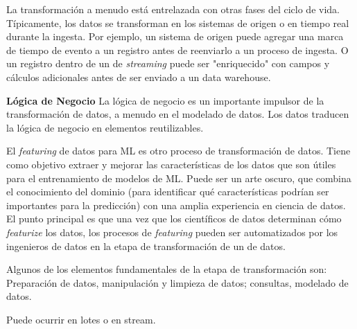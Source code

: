 \documentclass[12pt]{book}
\begin{document}
La transformación a menudo está entrelazada con otras fases del ciclo de vida. Típicamente, los datos se transforman en los sistemas de origen o en tiempo real durante la ingesta. 
Por ejemplo, un sistema de origen puede agregar una marca de tiempo de evento a un registro antes de reenviarlo a un proceso de ingesta. O un registro dentro de un  de \textit{streaming} puede ser "enriquecido" con campos y cálculos adicionales antes de ser enviado a un data warehouse.

\textbf{Lógica de Negocio}
La lógica de negocio es un importante impulsor de la transformación de datos, a menudo en el modelado de datos. Los datos traducen la lógica de negocio en elementos reutilizables.

El \textit{featuring} de datos para ML es otro proceso de transformación de datos. Tiene como objetivo extraer y mejorar las características de los datos que son útiles para el entrenamiento de modelos de ML. Puede ser un arte oscuro, que combina el conocimiento del dominio (para identificar qué características podrían ser importantes para la predicción) con una amplia experiencia en ciencia de datos.\\
El punto principal es que una vez que los científicos de datos determinan cómo \textit{featurize} los datos, los procesos de \textit{featuring} pueden ser automatizados por los ingenieros de datos en la etapa de transformación de un  de datos.

Algunos de los elementos fundamentales de la etapa de transformación son: Preparación de datos, manipulación y limpieza de datos; consultas, modelado de datos.

Puede ocurrir en lotes o en stream.
\end{document}
